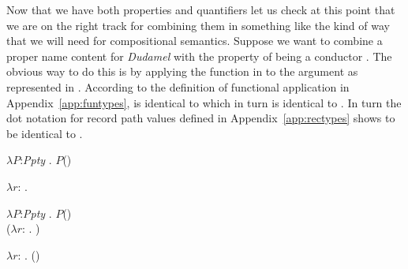 Now that we have both properties and quantifiers let us check at this
point that we are on the right track for combining them in something
like the kind of way that we will need for compositional semantics.
Suppose we want to combine a proper name content for \textit{Dudamel}
 with the property of being a conductor .  The
obvious way to do this is by applying the function in  to
the argument  as represented in .  According to
the definition of functional application in
Appendix~\ref{app:funtypes},  is identical to 
which in turn is identical to .  In turn the dot notation
for record path values defined in Appendix~\ref{app:rectypes} shows
 to be identical to .
\begin{ex} 
\begin{subex} 
 
\item $\lambda P$:\textit{Ppty} . $P$() 
 
\item $\lambda
r$:
.  

\item $\lambda P$:\textit{Ppty} . $P$() \\
\hspace*{1em}($\lambda
r$:
. )

\item $\lambda
r$:
. ()

\item {}

\item {}
 
\end{subex} 
\label{ex:diac}  
\end{ex} 
      

